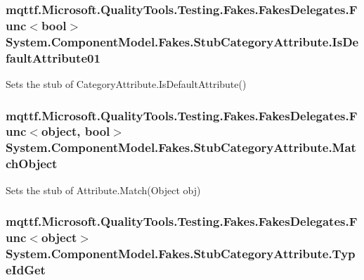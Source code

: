 \hypertarget{class_system_1_1_component_model_1_1_fakes_1_1_stub_category_attribute_a7bf6226bf8366283156f6b8339bd45bc}{
\subsubsection[{Is\-Default\-Attribute01}]{\setlength{\rightskip}{0pt plus 5cm}mqttf.\-Microsoft.\-Quality\-Tools.\-Testing.\-Fakes.\-Fakes\-Delegates.\-Func$<$bool$>$ System.\-Component\-Model.\-Fakes.\-Stub\-Category\-Attribute.\-Is\-Default\-Attribute01}}\label{class_system_1_1_component_model_1_1_fakes_1_1_stub_category_attribute_a7bf6226bf8366283156f6b8339bd45bc}


Sets the stub of Category\-Attribute.\-Is\-Default\-Attribute()

\hypertarget{class_system_1_1_component_model_1_1_fakes_1_1_stub_category_attribute_a51a96723abdd9aca597c31a258bfce55}{
\subsubsection[{Match\-Object}]{\setlength{\rightskip}{0pt plus 5cm}mqttf.\-Microsoft.\-Quality\-Tools.\-Testing.\-Fakes.\-Fakes\-Delegates.\-Func$<$object, bool$>$ System.\-Component\-Model.\-Fakes.\-Stub\-Category\-Attribute.\-Match\-Object}}\label{class_system_1_1_component_model_1_1_fakes_1_1_stub_category_attribute_a51a96723abdd9aca597c31a258bfce55}


Sets the stub of Attribute.\-Match(\-Object obj)

\hypertarget{class_system_1_1_component_model_1_1_fakes_1_1_stub_category_attribute_a0800d2d9ae5f5ac4173a5f53a08db44a}{
\subsubsection[{Type\-Id\-Get}]{\setlength{\rightskip}{0pt plus 5cm}mqttf.\-Microsoft.\-Quality\-Tools.\-Testing.\-Fakes.\-Fakes\-Delegates.\-Func$<$object$>$ System.\-Component\-Model.\-Fakes.\-Stub\-Category\-Attribute.\-Type\-Id\-Get}}\label{class_system_1_1_component_model_1_1_fakes_1_1_stub_category_attribute_a0800d2d9ae5f5ac4173a5f53a08db44a}


